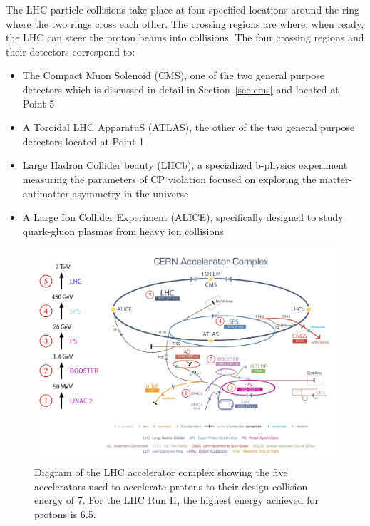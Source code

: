 The LHC particle collisions take place at four specified locations around the ring where the two rings
cross each other. The crossing regions are where, when ready, the LHC can steer the proton
beams into collisions. The four crossing regions and their detectors correspond to:
\begin{itemize}
\item The Compact Muon Solenoid (CMS), one of the two general purpose detectors which is
discussed in detail in Section~\ref{sec:cms} and located at Point 5
\item A Toroidal LHC ApparatuS (ATLAS), the other of the two general purpose detectors
located at Point 1
\item Large Hadron Collider beauty (LHCb), a specialized b-physics experiment measuring
the parameters of CP violation focused on exploring the matter-antimatter asymmetry
in the universe
\item A Large Ion Collider Experiment (ALICE), specifically designed to study
quark-gluon plasmas from heavy ion collisions
\end{itemize}

\begin{figure}[htbp]
\centering
     \includegraphics[width=1.0\textwidth]{cms_and_lhc/plots/lhc_complex.png}
     \caption{
Diagram of the LHC accelerator complex showing the five accelerators used to accelerate
protons to their design collision energy of 7\TeV. For the LHC Run II, the highest energy 
achieved for protons is 6.5\TeV.
     }
     \label{fig:lhc_complex}
\end{figure}



